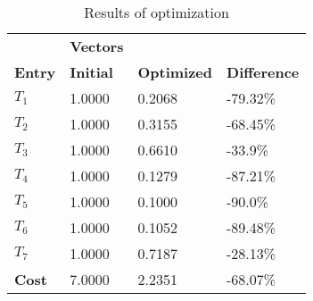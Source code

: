 \begin{table}[H]
\centering
\begin{tabular}{llll}
\textbf{}      & \cellcolor[HTML]{EFEFEF}\textbf{Vectors} & \textbf{} & \textbf{}         \\
\rowcolor[HTML]{EFEFEF} 
\textbf{Entry} & \textbf{Initial} & \textbf{Optimized} & \textbf{Difference} \\
$T_1$ & 1.0000 & 0.2068 & -79.32\% \\ 
$T_2$ & 1.0000 & 0.3155 & -68.45\% \\ 
$T_3$ & 1.0000 & 0.6610 & -33.9\% \\ 
$T_4$ & 1.0000 & 0.1279 & -87.21\% \\ 
$T_5$ & 1.0000 & 0.1000 & -90.0\% \\ 
$T_6$ & 1.0000 & 0.1052 & -89.48\% \\ 
$T_7$ & 1.0000 & 0.7187 & -28.13\% \\ 
\rowcolor[HTML]{EFEFEF} 
\textbf{Cost}  & 7.0000 & 2.2351 & -68.07\% \\ 
\end{tabular}
\caption{Results of optimization}
\label{tab:OptimizationAnalysis}
\end{table}